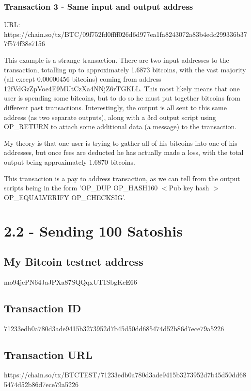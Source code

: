 \documentclass[11pt]{article}
\begin{document}
	\subsubsection*{Transaction 3 - Same input and output address}
	URL: https://chain.so/tx/BTC/09f752fd0ffff026d6d977ea1fa8243072a83b4edc299336b377f574f38e7156 \newline
	
	This example is a strange transaction. There are two input addresses to the transaction, totalling up to approximately 1.6873 bitcoins, with the vast majority (all except 0.00000456 bitcoins) coming from address 12fVdGzZpVoe4E9MUtCzXa4NNjZ6rTGKLL. This most likely means that one user is spending some bitcoins, but to do so he must put together bitcoins from different past transactions. Interestingly, the output is all sent to this same address (as two separate outputs), along with a 3rd output script using OP\_RETURN to attach some additional data (a message) to the transaction.
	
	My theory is that one user is trying to gather all of his bitcoins into one of his addresses, but once fees are deducted he has actually made a loss, with the total output being approximately 1.6870 bitcoins.
	
	This transaction is a pay to address transaction, as we can tell from the output scripts being in the form 'OP\_DUP OP\_HASH160 $<$Pub key hash $>$ OP\_EQUALVERIFY OP\_CHECKSIG'.
	
	\newpage
	
	
	\section*{2.2 - Sending 100 Satoshis}
	\subsection*{My Bitcoin testnet address}
	mo94jePN64JaJPXa87SQQqxUT1SbgKcE66
	
	\subsection*{Transaction ID}
	71233edb0a780d3ade9415b3273952d7b45d50dd685474d52b86d7ece79a5226
	
	\subsection*{Transaction URL} https://chain.so/tx/BTCTEST/71233edb0a780d3ade9415b3273952d7b45d50dd685474d52b86d7ece79a5226
	
\end{document}

